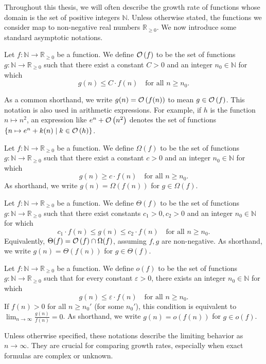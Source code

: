 Throughout this thesis, we will often describe the growth rate of functions whose domain is the set of positive integers $\mathbb{N}$. Unless otherwise stated, the functions we consider map to non-negative real numbers $\mathbb{R}_{\ge 0}$. We now introduce some standard asymptotic notations.

\begin{definition}
    Let $f: \mathbb{N} \to \mathbb{R}_{\ge 0}$ be a function.
    We define $\mathcal{O}\left(f\right)$ to be the set of functions $g: \mathbb{N} \to \mathbb{R}_{\ge 0}$ such that there exist a constant $C > 0$ and an integer $n_0 \in \mathbb{N}$ for which
    \[
        g(n) \leq C \cdot f(n) \quad \text{for all } n \geq n_0.
    \]
\end{definition}

As a common shorthand, we write $g(n) = \mathcal{O}\left(f(n)\right)$ to mean $g \in \mathcal{O}\left(f\right)$.
This notation is also used in arithmetic expressions.
For example, if $h$ is the function $n \mapsto n^2$,
an expression like $e^n + \mathcal{O}\left(n^2\right)$ denotes the set of functions $\{n \mapsto e^n + k(n) \mid k \in \mathcal{O}\left(h\right)\}$.

\begin{definition}
    Let $f: \mathbb{N} \to \mathbb{R}_{\ge 0}$ be a function.
    We define $\Omega(f)$ to be the set of functions $g: \mathbb{N} \to \mathbb{R}_{\ge 0}$ such that there exist a constant $c > 0$ and an integer $n_0 \in \mathbb{N}$ for which
    \[
        g(n) \geq c \cdot f(n) \quad \text{for all } n \geq n_0.
    \]
    As shorthand, we write $g(n) = \Omega(f(n))$ for $g \in \Omega(f)$.
\end{definition}

\begin{definition}
    Let $f: \mathbb{N} \to \mathbb{R}_{\ge 0}$ be a function.
    We define $\Theta(f)$ to be the set of functions $g: \mathbb{N} \to \mathbb{R}_{\ge 0}$ such that there exist constants $c_1 > 0, c_2 > 0$ and an integer $n_0 \in \mathbb{N}$ for which
    \[
        c_1 \cdot f(n) \leq g(n) \leq c_2 \cdot f(n) \quad \text{for all } n \geq n_0.
    \]
    Equivalently, $\Theta(f) = \mathcal{O}\left(f\right) \cap \Omega(f)$, assuming $f, g$ are non-negative.
    As shorthand, we write $g(n) = \Theta(f(n))$ for $g \in \Theta(f)$.
\end{definition}

\begin{definition}
    Let $f: \mathbb{N} \to \mathbb{R}_{\ge 0}$ be a function.
    We define $o(f)$  to be the set of functions $g: \mathbb{N} \to \mathbb{R}_{\ge 0}$
    such that for every constant $\varepsilon > 0$, there exists an integer $n_0 \in \mathbb{N}$ for which
    \[
        g(n) \leq \varepsilon \cdot f(n) \quad \text{for all } n \geq n_0.
    \]
    If $f(n) > 0$ for all $n \geq n_0'$ (for some $n_0'$),
    this condition is equivalent to $\lim_{n \to \infty} \frac{g(n)}{f(n)} = 0$.
    As shorthand, we write $g(n) = o(f(n))$ for $g \in o(f)$.
\end{definition}

Unless otherwise specified, these notations describe the limiting behavior as $n \to \infty$.
They are crucial for comparing growth rates, especially when exact formulas are complex or unknown.

